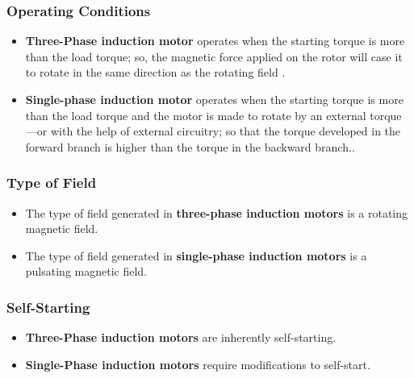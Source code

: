 \documentclass[journal]{IEEEtran}
\begin{document}

\subsubsection{Operating Conditions}
\begin{itemize}
    \item \textbf{Three-Phase induction motor} operates when the starting torque is more than the load torque; so, the magnetic force applied on the rotor will case it to rotate in the same direction as the rotating field \cite{tamer}\cite{guru2007}. 
    
    \item \textbf{Single-phase induction motor} operates when the starting torque is more than the load torque and the motor is made to rotate by an external torque —or with the help of external circuitry; so that the torque developed in the forward branch is higher than the torque in the backward branch.\cite{guru2007}.
    
    
\end{itemize}




\subsubsection{Type of Field}
\begin{itemize}
    \item The type of field generated in \textbf{three-phase induction motors} is a rotating magnetic field\cite{tamer}.
    \item The type of field generated in \textbf{single-phase induction motors} is a pulsating magnetic field.
\end{itemize}
\subsubsection{Self-Starting}
\begin{itemize}
    \item \textbf{Three-Phase induction motors} are inherently self-starting.
    \item \textbf{Single-Phase induction motors} require modifications to self-start.
\end{itemize}
\end{document}
